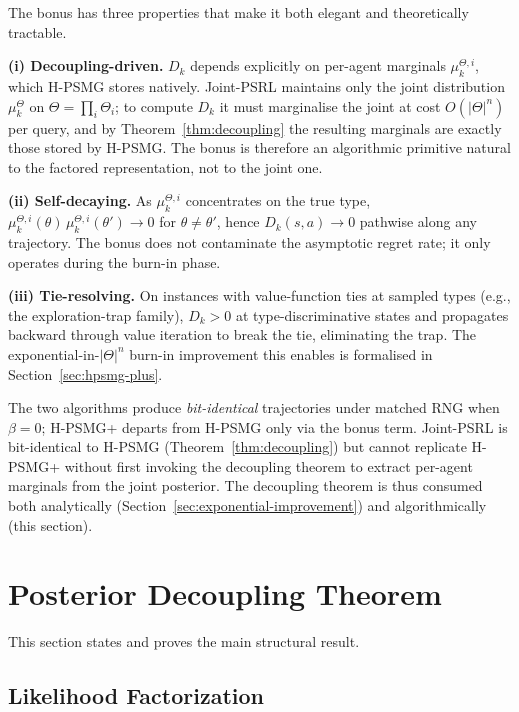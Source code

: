 \documentclass{article}
\def\textsuperscript#1{#1}%
\begin{document}
The bonus has three properties that make it both elegant and theoretically tractable.

\textbf{(i) Decoupling-driven.} $D_k$ depends explicitly on per-agent marginals $\mu_k^{\Theta, i}$, which H-PSMG stores natively. Joint-PSRL maintains only the joint distribution $\mu_k^\Theta$ on $\Theta = \prod_i \Theta_i$; to compute $D_k$ it must marginalise the joint at cost $O(|\Theta|^n)$ per query, and by Theorem~\ref{thm:decoupling} the resulting marginals are exactly those stored by H-PSMG. The bonus is therefore an algorithmic primitive natural to the factored representation, not to the joint one.

\textbf{(ii) Self-decaying.} As $\mu_k^{\Theta, i}$ concentrates on the true type, $\mu_k^{\Theta, i}(\theta)\, \mu_k^{\Theta, i}(\theta') \to 0$ for $\theta \neq \theta'$, hence $D_k(s, a) \to 0$ pathwise along any trajectory. The bonus does not contaminate the asymptotic regret rate; it only operates during the burn-in phase.

\textbf{(iii) Tie-resolving.} On instances with value-function ties at sampled types (e.g., the exploration-trap family), $D_k > 0$ at type-discriminative states and propagates backward through value iteration to break the tie, eliminating the trap. The exponential-in-$|\Theta|^n$ burn-in improvement this enables is formalised in Section~\ref{sec:hpsmg-plus}.

The two algorithms produce \emph{bit-identical} trajectories under matched RNG when $\beta = 0$; H-PSMG\textsuperscript{+} departs from H-PSMG only via the bonus term. Joint-PSRL is bit-identical to H-PSMG (Theorem~\ref{thm:decoupling}) but cannot replicate H-PSMG\textsuperscript{+} without first invoking the decoupling theorem to extract per-agent marginals from the joint posterior. The decoupling theorem is thus consumed both analytically (Section~\ref{sec:exponential-improvement}) and algorithmically (this section).

\section{Posterior Decoupling Theorem}
\label{sec:decoupling}

This section states and proves the main structural result.

\subsection{Likelihood Factorization}
\end{document}
